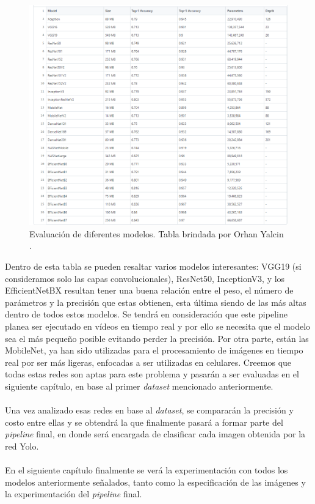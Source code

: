 \begin{figure}[h!]
\includegraphics[width=1.3\textwidth]{images/EvaluacionModelos.png}
\caption{Evaluación de diferentes modelos. Tabla brindada por Orhan Yalcin \cite{DataModelos}. }
\label{evaluación}
\end{figure}

Dentro de esta tabla se pueden resaltar varios modelos interesantes: VGG19 (si consideramos solo las capas convolucionales), ResNet50, InceptionV3, y los EfficientNetBX resultan tener una buena relación entre el peso, el número de parámetros y la precisión que estas obtienen, esta última siendo de las más altas dentro de todos estos modelos. Se tendrá en consideración que este pipeline planea ser ejecutado en vídeos en tiempo real y por ello se necesita que el modelo sea el más pequeño posible evitando perder la precisión. Por otra parte, están las MobileNet, ya han sido utilizadas para el procesamiento de imágenes en tiempo real por ser más ligeras, enfocadas a ser utilizadas en celulares. Creemos que todas estas redes son aptas para este problema y pasarán a ser evaluadas en el siguiente capítulo, en base al primer \textit{dataset} mencionado anteriormente. \\\\
Una vez analizado esas redes en base al \textit{dataset}, se compararán la precisión y costo entre ellas y se obtendrá la que finalmente pasará a formar parte del \textit{pipeline} final, en donde será encargada de clasificar cada imagen obtenida por la red Yolo.\\\\
En el siguiente capítulo finalmente se verá la experimentación con todos los modelos anteriormente señalados, tanto como la especificación de las imágenes y la experimentación del \textit{pipeline} final.